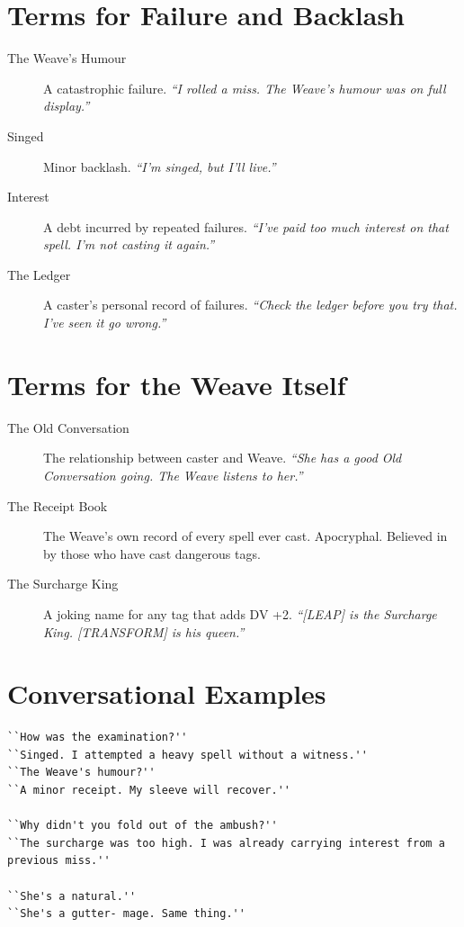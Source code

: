 \section{Terms for Failure and Backlash}

\begin{description}
    \item[The Weave's Humour] A catastrophic failure. \emph{``I rolled a miss. The Weave's humour was on full display.''}
    \item[Singed] Minor backlash. \emph{``I'm singed, but I'll live.''}
    \item[Interest] A debt incurred by repeated failures. \emph{``I've paid too much interest on that spell. I'm not casting it again.''}
    \item[The Ledger] A caster's personal record of failures. \emph{``Check the ledger before you try that. I've seen it go wrong.''}
\end{description}

\section{Terms for the Weave Itself}

\begin{description}
    \item[The Old Conversation] The relationship between caster and Weave. \emph{``She has a good Old Conversation going. The Weave listens to her.''}
    \item[The Receipt Book] The Weave's own record of every spell ever cast. Apocryphal. Believed in by those who have cast dangerous tags.
    \item[The Surcharge King] A joking name for any tag that adds DV +2. \emph{``[LEAP] is the Surcharge King. [TRANSFORM] is his queen.''}
\end{description}

\section{Conversational Examples}

\begin{verbatim}
``How was the examination?''
``Singed. I attempted a heavy spell without a witness.''
``The Weave's humour?''
``A minor receipt. My sleeve will recover.''

``Why didn't you fold out of the ambush?''
``The surcharge was too high. I was already carrying interest from a previous miss.''

``She's a natural.''
``She's a gutter- mage. Same thing.''
\end{verbatim}

